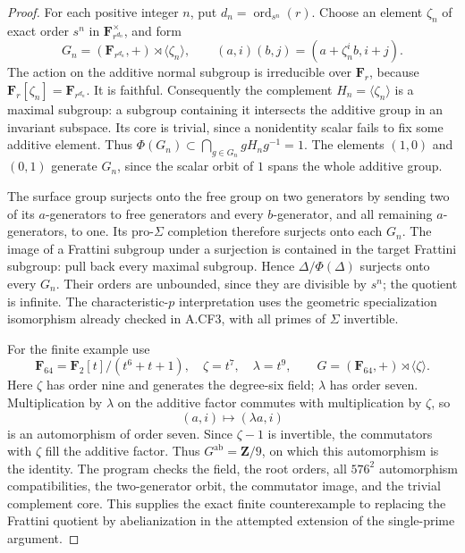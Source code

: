 \begin{proof}
For each positive integer $n$, put $d_n=\operatorname{ord}_{s^n}(r)$.
Choose an element $\zeta_n$ of exact order $s^n$ in
$\mathbf F_{r^{d_n}}^\times$, and form
\[
 G_n=(\mathbf F_{r^{d_n}},+)\rtimes\langle\zeta_n\rangle,
 \qquad (a,i)(b,j)=(a+\zeta_n^i b,i+j).
\]
The action on the additive normal subgroup is irreducible over
$\mathbf F_r$, because $\mathbf F_r[\zeta_n]=\mathbf F_{r^{d_n}}$.
It is faithful. Consequently the complement $H_n=\langle\zeta_n\rangle$
is a maximal subgroup: a subgroup containing it intersects the
additive group in an invariant subspace. Its core is trivial,
since a nonidentity scalar fails to fix some additive element.
Thus $\Phi(G_n)\subset\bigcap_{g\in G_n}gH_ng^{-1}=1$.
The elements $(1,0)$ and $(0,1)$ generate $G_n$, since the scalar
orbit of $1$ spans the whole additive group.

The surface group surjects onto the free group on two generators
by sending two of its $a$-generators to free generators and every
$b$-generator, and all remaining $a$-generators, to one. Its
pro-$\Sigma$ completion therefore surjects onto each $G_n$.
The image of a Frattini subgroup under a surjection is contained
in the target Frattini subgroup: pull back every maximal subgroup.
Hence $\Delta/\Phi(\Delta)$ surjects onto every $G_n$.
Their orders are unbounded, since they are divisible by $s^n$;
the quotient is infinite. The characteristic-$p$ interpretation
uses the geometric specialization isomorphism already checked in
A.CF3, with all primes of $\Sigma$ invertible.

For the finite example use
\[
 \mathbf F_{64}=\mathbf F_2[t]/(t^6+t+1),\quad
 \zeta=t^7,\quad\lambda=t^9,
 \qquad G=(\mathbf F_{64},+)\rtimes\langle\zeta\rangle.
\]
Here $\zeta$ has order nine and generates the degree-six field;
$\lambda$ has order seven. Multiplication by $\lambda$ on the
additive factor commutes with multiplication by $\zeta$, so
\[
                    (a,i)\longmapsto(\lambda a,i)
\]
is an automorphism of order seven. Since $\zeta-1$ is invertible,
the commutators with $\zeta$ fill the additive factor. Thus
$G^{\mathrm{ab}}=\mathbf Z/9$, on which this automorphism is
the identity. The program 
checks the field, the root orders, all $576^2$ automorphism
compatibilities, the two-generator orbit, the commutator image,
and the trivial complement core. This supplies the exact finite
counterexample to replacing the Frattini quotient by abelianization
in the attempted extension of the single-prime argument.
\end{proof}
